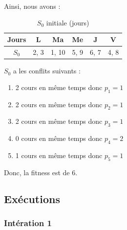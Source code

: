 Ainsi, nous avons :

\begin{table}[!h]
    \centering
    \begin{tabular}{|c|c|c|c|c|c|}
        \hline
        Jours & L    & Ma    & Me   & J    & V    \\
        \hline
        $S_0$ & 2, 3 & 1, 10 & 5, 9 & 6, 7 & 4, 8 \\
        \hline
    \end{tabular}
    \caption{$S_0$ initiale (jours)}\label{tab:s-0-taboue-jour}
\end{table}

$S_0$ a les conflits suivants :
\begin{enumerate}
    \item 2 cours en même temps donc $p_1 = 1$
    \item 2 cours en même temps donc $p_2 = 1$
    \item 2 cours en même temps donc $p_3 = 1$
    \item 0 cours en même temps donc $p_4 = 2$
    \item 1 cours en même temps donc $p_5 = 1$
\end{enumerate}
Donc, la fitness est de $6$.

\subsection{Exécutions}\label{subsec:executions}

\subsubsection{Intération 1}

